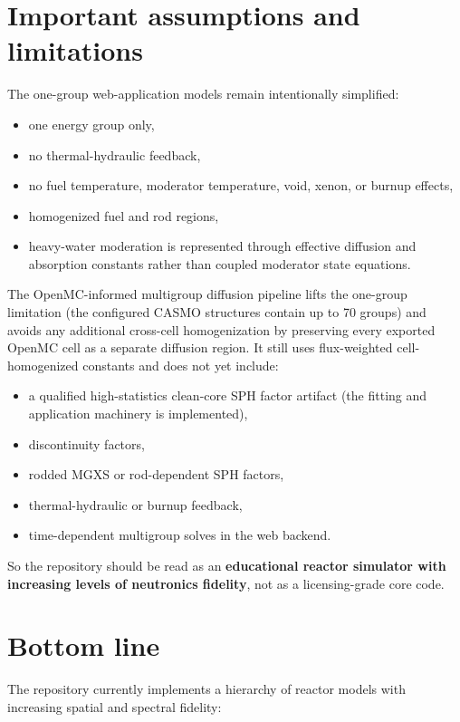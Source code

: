 \documentclass[11pt]{article}
\begin{document}
\section{Important assumptions and limitations}

The one-group web-application models remain intentionally simplified:
\begin{itemize}
  \item one energy group only,
  \item no thermal-hydraulic feedback,
  \item no fuel temperature, moderator temperature, void, xenon, or burnup effects,
  \item homogenized fuel and rod regions,
  \item heavy-water moderation is represented through effective diffusion and
        absorption constants rather than coupled moderator state equations.
\end{itemize}

The OpenMC-informed multigroup diffusion pipeline lifts the one-group
limitation (the configured CASMO structures contain up to 70 groups) and
avoids any additional cross-cell homogenization by preserving every exported
OpenMC cell as a separate diffusion region.  It still uses flux-weighted
cell-homogenized constants and does not yet include:
\begin{itemize}
  \item a qualified high-statistics clean-core SPH factor artifact (the
        fitting and application machinery is implemented),
  \item discontinuity factors,
  \item rodded MGXS or rod-dependent SPH factors,
  \item thermal-hydraulic or burnup feedback,
  \item time-dependent multigroup solves in the web backend.
\end{itemize}

So the repository should be read as an \textbf{educational reactor simulator with
increasing levels of neutronics fidelity}, not as a licensing-grade core code.

\section{Bottom line}

The repository currently implements a hierarchy of reactor models with
increasing spatial and spectral fidelity:
\end{document}

